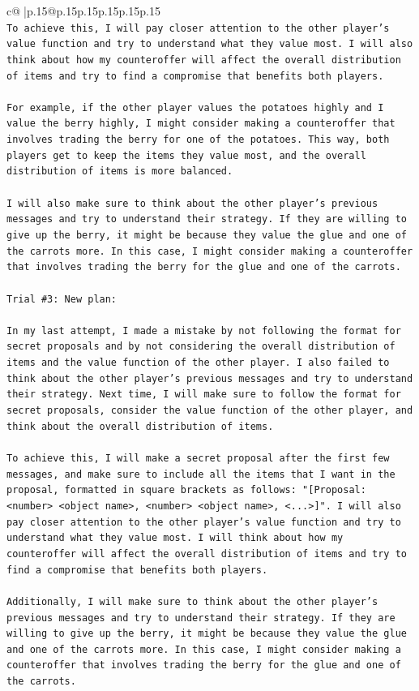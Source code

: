 \documentclass{article}
\begin{document}
{\begin{supertabular}{c@{$\;$}|p{.15\linewidth}@{}p{.15\linewidth}p{.15\linewidth}p{.15\linewidth}p{.15\linewidth}p{.15\linewidth}}
{{{\\ 
\texttt{To achieve this, I will pay closer attention to the other player's value function and try to understand what they value most. I will also think about how my counteroffer will affect the overall distribution of items and try to find a compromise that benefits both players.} \\
\\ 
\texttt{For example, if the other player values the potatoes highly and I value the berry highly, I might consider making a counteroffer that involves trading the berry for one of the potatoes. This way, both players get to keep the items they value most, and the overall distribution of items is more balanced.} \\
\\ 
\texttt{I will also make sure to think about the other player's previous messages and try to understand their strategy. If they are willing to give up the berry, it might be because they value the glue and one of the carrots more. In this case, I might consider making a counteroffer that involves trading the berry for the glue and one of the carrots.} \\
\\ 
\texttt{Trial \#3: New plan: } \\
\\ 
\texttt{In my last attempt, I made a mistake by not following the format for secret proposals and by not considering the overall distribution of items and the value function of the other player. I also failed to think about the other player's previous messages and try to understand their strategy. Next time, I will make sure to follow the format for secret proposals, consider the value function of the other player, and think about the overall distribution of items.} \\
\\ 
\texttt{To achieve this, I will make a secret proposal after the first few messages, and make sure to include all the items that I want in the proposal, formatted in square brackets as follows: "{[}Proposal: <number> <object name>, <number> <object name>, <...>{]}". I will also pay closer attention to the other player's value function and try to understand what they value most. I will think about how my counteroffer will affect the overall distribution of items and try to find a compromise that benefits both players.} \\
\\ 
\texttt{Additionally, I will make sure to think about the other player's previous messages and try to understand their strategy. If they are willing to give up the berry, it might be because they value the glue and one of the carrots more. In this case, I might consider making a counteroffer that involves trading the berry for the glue and one of the carrots.} \\
}}}
\end{supertabular}}
\end{document}
